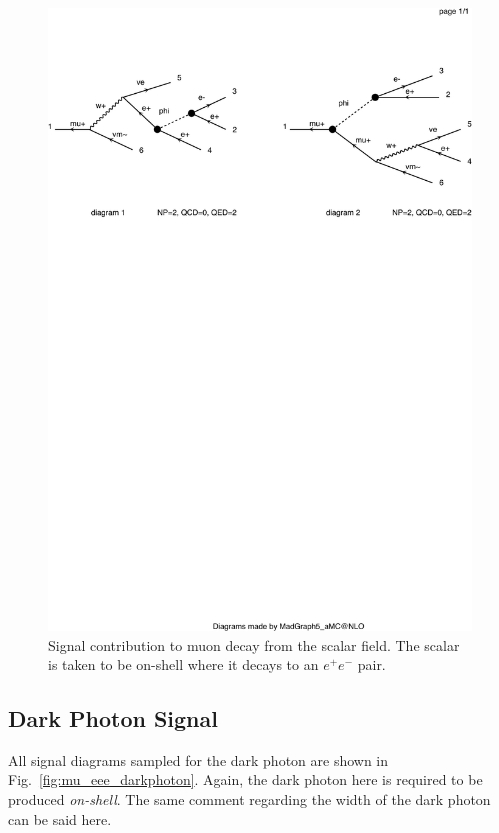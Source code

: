 \begin{figure}[h]
    \centering
    \includegraphics[width=\textwidth,clip=true,viewport=0 500 500 700]{Figures/madgraph_diagrams/mu_eeenunu_scalar.pdf}
    \caption[Signal contribution to muon decay from the scalar field.]{Signal contribution to muon decay from the scalar field. The scalar is taken to be on-shell where it decays to an $e^+ e^-$ pair.}
    \label{fig:mu_eee_scalar}
\end{figure}

\subsection{Dark Photon Signal}
All signal diagrams sampled for the dark photon are shown in Fig.\ \ref{fig:mu_eee_darkphoton}.
Again, the dark photon here is required to be produced \emph{on-shell}.
The same comment regarding the width of the dark photon can be said here.

